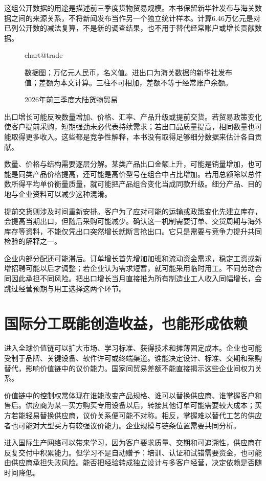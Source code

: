 \documentclass[UTF8,fontset=fandol,zihao=-4,oneside,openany]{ctexbook}
\makeatletter
\newcommand{\Chart}[3]{\begin{figure}[htbp]\centering\csname chart@#1\endcsname\caption{#2}\par\small #3\end{figure}}
\makeatother
\begin{document}
这组公开数据的用途是描述前三季度货物贸易规模。本书保留新华社发布与海关数据之间的来源关系，不将新闻发布当作另一个独立统计样本。计算6.46万亿元是对已列公开数的减法复算，不是新的调查结果，也不用于替代经常账户或增长贡献数据。

\Chart{trade}{2026年前三季度大陆货物贸易}{数据图；万亿元人民币，名义值。进出口为海关数据的新华社发布值；差额为本文计算。三柱不可相加，差额不等于经常账户余额。\cite{Trade2026}}

出口增长可能反映数量增加、价格、汇率、产品升级或提前交货。若贸易政策变化使客户提前采购，短期强劲未必代表持续需求；若出口品质量提高，相同数量也可能取得更多收入。这些都是竞争性解释，本书没有取得足够细分数据来估计各自贡献。

\label{arg:P207}
数量、价格与结构需要逐层分解。某类产品出口金额上升，可能是销量增加，也可能是同类产品价格提高，还可能是高价型号在组合中占比增加。若用总额除以总件数所得平均单价衡量质量，就可能把产品组合变化当成同款升级。细分产品、目的地与企业资料可以减少这种混淆。

提前交货则涉及时间重新安排。客户为了应对可能的运输或政策变化先建立库存，会提高当期出口，但随后采购可能减少。确认这一机制需要订单、交货周期与海外库存等资料，不能仅凭出口突然增长就断言抢出口。它只是需要与竞争力提升共同检验的解释之一。

企业内部分配还可能滞后。订单增长首先增加加班和流动资金需求，稳定工资或新增招聘可能以后才调整；若企业认为需求短暂，就可能采用临时用工。不同劳动合同因此承担不同风险。把出口增长当月直接推为所有制造业工人收入同幅增长，会跳过经营预期与用工选择这两个环节。

\section{国际分工既能创造收益，也能形成依赖}
进入全球价值链可以扩大市场、学习标准、获得技术和摊薄固定成本。企业也可能受制于品牌、关键设备、软件许可或终端渠道。谁能决定设计、标准、交期和采购替代，影响价值链中的议价能力。国家间贸易差额不能直接揭示这些企业间权力关系。

\label{arg:P208}
价值链中的控制权常体现在谁能改变产品规格、谁可以替换供应商、谁掌握客户和售后。供应商为某一买方购买专用设备以后，转接其他订单可能需要较大成本；买方若能轻易替换供应商，议价关系便可能不对称。相反，掌握难以替代工艺的供应者也可能对大型买方有较强议价能力。企业规模与链条位置需要共同分析。

进入国际生产网络可以带来学习，因为客户要求质量、交期和可追溯性，供应商在反复交付中积累能力。但学习不是自动赠予：培训、认证和试错需要资金，也可能由供应商承担失败风险。能否把经验转成独立设计与多客户经营，决定依赖是否随时间降低。
\end{document}
